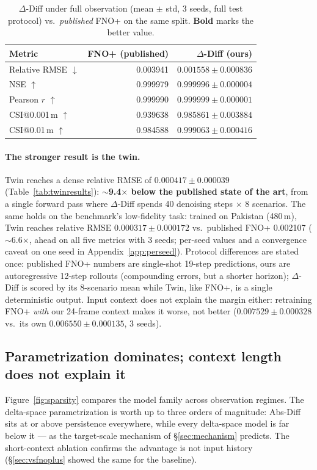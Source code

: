 \documentclass[11pt]{article}
\newcommand{\ours}{\mbox{$\Delta$-Diff}}
\newcommand{\absdiff}{\mbox{Abs-Diff}}
\newcommand{\twin}{\mbox{Twin}}
\begin{document}
\begin{table}[H]
\centering
\caption{\ours{} under full observation (mean $\pm$ std, 3 seeds, full
test protocol) vs.\ \emph{published} FNO+ on the same split.
\textbf{Bold} marks the better value.}
\label{tab:vsfnoplus}
\begin{tabular}{lrr}
\toprule
Metric & FNO+ (published) & \ours{} (ours) \\
\midrule
Relative RMSE $\downarrow$ & 0.003941 & $\mathbf{0.001558 \pm 0.000836}$ \\
NSE $\uparrow$              & 0.999979 & $\mathbf{0.999996 \pm 0.000004}$ \\
Pearson $r$ $\uparrow$      & 0.999990 & $\mathbf{0.999999 \pm 0.000001}$ \\
CSI@0.001\,m $\uparrow$     & 0.939638 & $\mathbf{0.985861 \pm 0.003884}$ \\
CSI@0.01\,m $\uparrow$      & 0.984588 & $\mathbf{0.999063 \pm 0.000416}$ \\
\bottomrule
\end{tabular}
\end{table}

\paragraph{The stronger result is the twin.} \twin{} reaches a dense
relative RMSE of $0.000417 \pm 0.000039$
(Table~\ref{tab:twinresults}): $\sim$\textbf{9.4$\times$ below the
published state of the art}, from a single forward pass where \ours{}
spends 40 denoising steps $\times$ 8 scenarios. The same holds on the
benchmark's low-fidelity task: trained on Pakistan (480\,m), \twin{}
reaches relative RMSE $0.000317 \pm 0.000172$ vs.\ published FNO+
0.002107 ($\sim$6.6$\times$, ahead on all five metrics with 3 seeds;
per-seed values and a convergence caveat on one seed in
Appendix~\ref{app:perseed}). Protocol differences are stated once:
published FNO+ numbers are single-shot 19-step predictions, ours are
autoregressive 12-step rollouts (compounding errors, but a shorter
horizon); \ours{} is scored by its 8-scenario mean while \twin{}, like
FNO+, is a single deterministic output. Input context does not explain
the margin either: retraining FNO+ \emph{with} our 24-frame context makes
it worse, not better ($0.007529\pm0.000328$ vs.\ its own
$0.006550\pm0.000135$, 3 seeds).

\subsection{Parametrization dominates; context length does not explain it}
\label{sec:paramresults}
Figure~\ref{fig:sparsity} compares the model family across observation
regimes. The delta-space parametrization is worth up to three orders of
magnitude: \absdiff{} sits at or above persistence everywhere, while
every delta-space model is far below it --- as the target-scale mechanism
of \S\ref{sec:mechanism} predicts. The short-context ablation confirms
the advantage is not input history (\S\ref{sec:vsfnoplus} showed the same
for the baseline).
\end{document}
